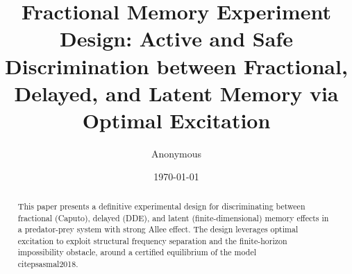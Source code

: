 \documentclass[11pt]{article}
\title{Fractional Memory Experiment Design: Active and Safe Discrimination between Fractional, Delayed, and Latent Memory via Optimal Excitation}
\author{Anonymous}
\date{\today}
\begin{document}
\maketitle
\begin{abstract}
This paper presents a definitive experimental design for discriminating between fractional (Caputo), delayed (DDE), and latent (finite-dimensional) memory effects in a predator-prey system with strong Allee effect. The design leverages optimal excitation to exploit structural frequency separation and the finite-horizon impossibility obstacle, around a certified equilibrium of the model \\citep{sasmal2018}.
\end{abstract}




\theoremstyle{plain}
\newtheorem{theorem}{Theorem}[section]
\newtheorem{lemma}[theorem]{Lemma}
\newtheorem{corollary}[theorem]{Corollary}
\theoremstyle{definition}
\newtheorem{definition}[theorem]{Definition}
\theoremstyle{remark}
\newtheorem{remark}[theorem]{Remark}















\end{document}
